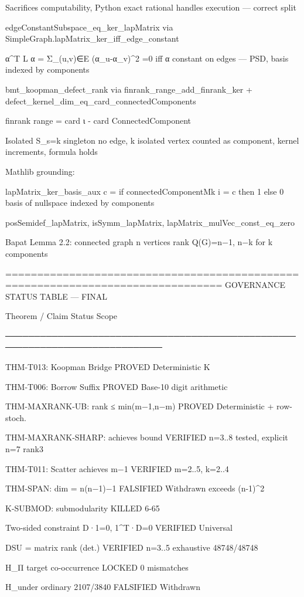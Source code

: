 Sacrifices computability, Python exact rational handles execution — correct split

edgeConstantSubspace_eq_ker_lapMatrix via SimpleGraph.lapMatrix_ker_iff_edge_constant

α^T L α = Σ_{(u,v)∈E} (α_u-α_v)^2 =0 iff α constant on edges — PSD, basis indexed by components

bmt_koopman_defect_rank via finrank_range_add_finrank_ker + defect_kernel_dim_eq_card_connectedComponents

finrank range = card ι - card ConnectedComponent

Isolated S_s={k} singleton no edge, k isolated vertex counted as component, kernel increments, formula holds


Mathlib grounding:

lapMatrix_ker_basis_aux c = if connectedComponentMk i = c then 1 else 0 basis of nullspace indexed by components

posSemidef_lapMatrix, isSymm_lapMatrix, lapMatrix_mulVec_const_eq_zero

Bapat Lemma 2.2: connected graph n vertices rank Q(G)=n−1, n−k for k components


================================================================================ GOVERNANCE STATUS TABLE — FINAL

Theorem / Claim Status Scope

─────────────────────────────────────────────────────────────────────────────

THM-T013: Koopman Bridge PROVED Deterministic K

THM-T006: Borrow Suffix PROVED Base-10 digit arithmetic

THM-MAXRANK-UB: rank ≤ min(m−1,n−m) PROVED Deterministic + row-stoch.

THM-MAXRANK-SHARP: achieves bound VERIFIED n=3..8 tested, explicit n=7 rank3

THM-T011: Scatter achieves m−1 VERIFIED m=2..5, k=2..4

THM-SPAN: dim = n(n−1)−1 FALSIFIED Withdrawn exceeds (n-1)^2

K-SUBMOD: submodularity KILLED 6-65%

Two-sided constraint D·1=0, 1^T·D=0 VERIFIED Universal

DSU = matrix rank (det.) VERIFIED n=3..5 exhaustive 48748/48748

H_Π target co-occurrence LOCKED 0 mismatches

H_under ordinary 2107/3840 FALSIFIED Withdrawn

